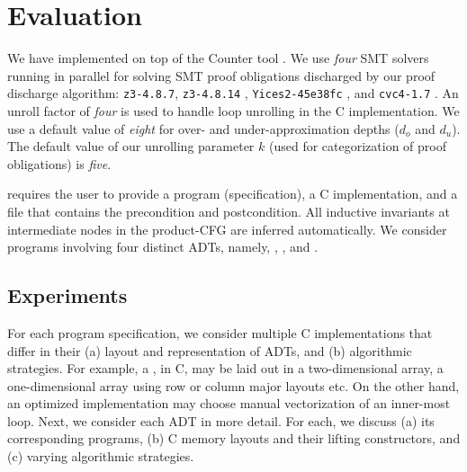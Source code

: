 
\vspace{-10px}
\section{Evaluation}
\label{sec:syn-eval}
\vspace{-5px}
We have implemented \toolName{} on top of the
Counter tool \cite{oopsla20}.
We use {\em four} SMT solvers running in parallel for solving
SMT proof obligations discharged by our proof discharge algorithm:
{\tt z3-4.8.7}, {\tt z3-4.8.14} \cite{z3},
{\tt Yices2-45e38fc} \cite{yices},
and {\tt cvc4-1.7} \cite{cvc4solver}.
An unroll factor of {\em four} is used to handle loop unrolling in the C implementation.
We use a default value of {\em eight} for
over- and under-approximation depths ($d_o$ and $d_u$).
The default value of
our unrolling parameter $k$ (used for categorization of proof obligations) is {\em five}.

\toolName{} requires the user to provide a \SpecL{} program (specification), a C implementation,
and a file that contains the precondition and postcondition. All inductive invariants
at intermediate nodes in the product-CFG are inferred automatically.
We consider programs involving four distinct ADTs, namely,
 ,  ,  
and  .

\subsection{Experiments}
For each \SpecL{} program specification, we consider multiple
C implementations that differ in their (a) layout and representation of ADTs, and
(b) algorithmic strategies. For example, a , in C, may be laid out
in a two-dimensional array, a one-dimensional array using row or column major
layouts etc. On the other hand, an optimized implementation may choose manual vectorization
of an inner-most loop. Next, we consider each ADT in more detail. For each,
we discuss (a) its corresponding programs, (b) C memory layouts and their lifting
constructors, and (c) varying algorithmic strategies.



